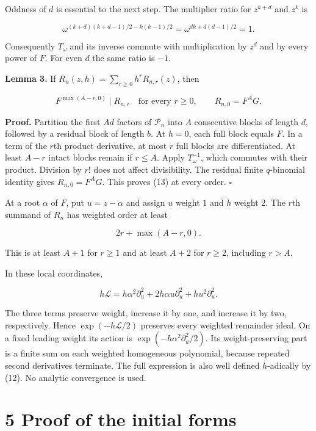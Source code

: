 \documentclass[
  11pt,
]{article}
\begin{document}
Oddness of \(d\) is essential to the next step. The multiplier ratio for
\(z^{k+d}\) and \(z^k\) is

\[
\omega^{(k+d)(k+d-1)/2-k(k-1)/2}
=\omega^{dk+d(d-1)/2}=1.
\]

Consequently \(T_\omega\) and its inverse commute with multiplication by
\(z^d\) and by every power of \(F\). For even \(d\) the same ratio is
\(-1\).

\textbf{Lemma 3.} If \(R_n(z,h)=\sum_{r\geq0}h^rR_{n,r}(z)\), then

\[
F^{\max(A-r,0)}\mid R_{n,r}\quad\text{for every }r\geq0,
\qquad R_{n,0}=F^AG. \tag{13}
\]

\textbf{Proof.} Partition the first \(Ad\) factors of \(\mathcal P_n\)
into \(A\) consecutive blocks of length \(d\), followed by a residual
block of length \(b\). At \(h=0\), each full block equals \(F\). In a
term of the \(r\)th product derivative, at most \(r\) full blocks are
differentiated. At least \(A-r\) intact blocks remain if \(r\leq A\).
Apply \(T_\omega^{-1}\), which commutes with their product. Division by
\(r!\) does not affect divisibility. The residual finite \(q\)-binomial
identity gives \(R_{n,0}=F^AG\). This proves (13) at every order.
\(\square\)

At a root \(\alpha\) of \(F\), put \(u=z-\alpha\) and assign \(u\)
weight \(1\) and \(h\) weight \(2\). The \(r\)th summand of \(R_n\) has
weighted order at least

\[
2r+\max(A-r,0). \tag{14}
\]

This is at least \(A+1\) for \(r\geq1\) and at least \(A+2\) for
\(r\geq2\), including \(r>A\).

In these local coordinates,

\[
h\mathcal L=h\alpha^2\partial_u^2
+2h\alpha u\partial_u^2+hu^2\partial_u^2. \tag{15}
\]

The three terms preserve weight, increase it by one, and increase it by
two, respectively. Hence \(\exp(-h\mathcal L/2)\) preserves every
weighted remainder ideal. On a fixed leading weight its action is
\(\exp(-h\alpha^2\partial_u^2/2)\). Its weight-preserving part is a
finite sum on each weighted homogeneous polynomial, because repeated
second derivatives terminate. The full expression is also well defined
\(h\)-adically by (12). No analytic convergence is used.

\section{5 Proof of the initial forms}\label{proof-of-the-initial-forms}
\end{document}
